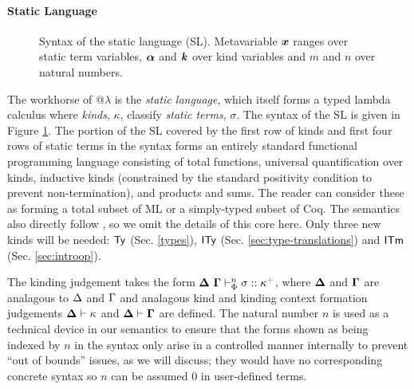 \documentclass[10pt,preprint]{sigplanconf}
\newcommand{\moutput}{^{\color{gray}+}}
\begin{document}
\paragraph{Static Language}
\begin{figure}[t]
\small
\hspace{-5px}
\caption{Syntax of the static language (SL). Metavariable ${\textbf{\textit{x}}}$ ranges over static term variables, $\boldsymbol{\alpha}$ and $\textbf{\textit{k}}$ over kind variables and $m$ and $n$ over natural numbers.}\vspace{-5px}
\label{syntax-SL}
\end{figure}
The workhorse of @$\lambda$ is the \emph{static language}, which itself forms a typed lambda calculus where 
\emph{kinds}, $\kappa$, classify \emph{static terms}, $\sigma$.  The syntax of the SL is given in Figure \ref{syntax-SL}. The portion of the SL covered by the first row of kinds and first four rows of static terms in the syntax forms an entirely standard  functional programming language consisting of total functions, universal quantification over kinds, inductive kinds (constrained by the standard positivity condition to prevent non-termination), and products and sums. The reader can consider these as forming a total subset of ML or a simply-typed subset of Coq. The semantics also directly follow \cite{pfpl}, so we  omit the details of this core here.  Only three new  kinds will be needed: ${\sf Ty}$ (Sec. \ref{types}), ${\sf ITy}$ (Sec. \ref{sec:type-translations}) and ${\sf ITm}$ (Sec. \ref{sec:introop}). 

The kinding judgement takes the form $\sofkX{\st}{\kappa\moutput}$, where $\boldsymbol\Delta$ and $\boldsymbol\Gamma$ are analagous to $\Delta$ and $\Gamma$ and analagous kind and kinding context formation judgements $\boldsymbol\Delta \vdash \kappa$ and $\boldsymbol\Delta \vdash \boldsymbol\Gamma$ are  defined. The natural number $n$ is used as a technical device in our semantics to ensure that the forms shown as being indexed by $n$ in the syntax only arise in a controlled manner internally to prevent ``out of bounds'' issues, as we will discuss; they would have no corresponding concrete syntax so $n$ can be assumed $0$ in user-defined terms. 
\end{document}

